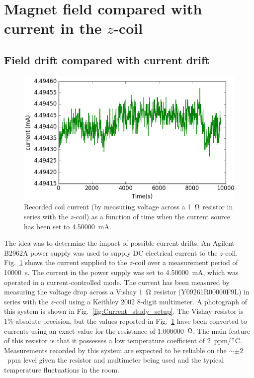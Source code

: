 \section{Magnet field compared with current in the $z$-coil}

\subsection{Field drift compared with current drift\label{sec:current-drift}}

\begin{figure}%
\centering \includegraphics[width=0.7\linewidth]{figures/current}
\caption{Recorded coil current (by measuring voltage across a 1~$\ohm$
  resistor in series with the $z$-coil) as a function of time when the
  current source has been set to 4.50000~mA.\label{fig:current}}
\end{figure}

The idea was to determine the impact of possible current drifts.  An
Agilent B2962A power supply was used to supply DC electrical current
to the $z$-coil.  Fig.~\ref{fig:current} shows the current supplied to
the $z$-coil over a measurement period of 10000~s.  The current in the
power supply was set to 4.50000~mA, which was operated in a
current-controlled mode.  The current has been measured by measuring
the voltage drop across a Vishay 1~$\ohm$ resistor (Y09261R00000F9L)
in series with the $z$-coil using a Keithley 2002 8-digit multimeter.
A photograph of this system is shown in
Fig.~\ref{fig:Current_study_setup}.  The Vishay resistor is 1\%
absolute precision, but the values reported in Fig.~\ref{fig:current}
have been converted to currents using an exact value for the
resistance of 1.000000~$\ohm$.  The main feature of this resistor is
that it possesses a low temperature coefficient of 2~ppm/$\degree$C.
Measurements recorded by this system are expected to be reliable on
the $\sim\pm 2$~ppm level given the resistor and multimeter being used
and the typical temperature fluctuations in the room.

